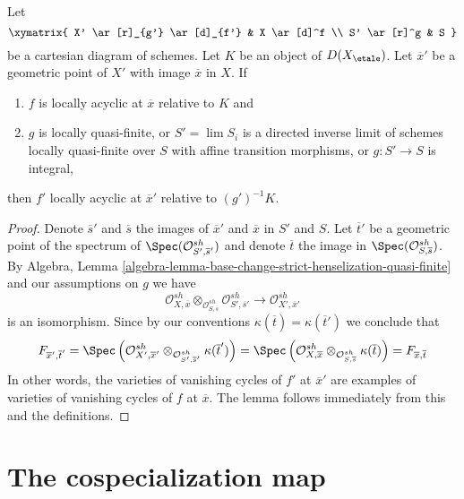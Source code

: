 \begin{lemma}
\label{lemma-locally-acyclic-quasi-finite-base-change}
Let
$$
\xymatrix{
X' \ar[r]_{g'} \ar[d]_{f'} & X \ar[d]^f \\
S' \ar[r]^g & S
}
$$
be a cartesian diagram of schemes. Let $K$ be an object of $D(X_\etale)$.
Let $\overline{x}'$ be a geometric point of $X'$ with image $\overline{x}$
in $X$. If
\begin{enumerate}
\item $f$ is locally acyclic at $\overline{x}$ relative to $K$ and
\item $g$ is locally quasi-finite, or $S' = \lim S_i$
is a directed inverse limit of schemes locally quasi-finite over $S$
with affine transition morphisms, or $g : S' \to S$ is integral,
\end{enumerate}
then $f'$ locally acyclic at $\overline{x}'$ relative to $(g')^{-1}K$.
\end{lemma}

\begin{proof}
Denote $\overline{s}'$ and $\overline{s}$ the images of
$\overline{x}'$ and $\overline{x}$ in $S'$ and $S$.
Let $\overline{t}'$ be a geometric point of the spectrum of
$\Spec(\mathcal{O}^{sh}_{S', \overline{s}'})$ and denote
$\overline{t}$ the image in $\Spec(\mathcal{O}^{sh}_{S, \overline{s}})$.
By Algebra, Lemma
\ref{algebra-lemma-base-change-strict-henselization-quasi-finite}
and our assumptions on $g$ we have
$$
\mathcal{O}^{sh}_{X, \overline{x}}
\otimes_{\mathcal{O}^{sh}_{S, \overline{s}}}
\mathcal{O}^{sh}_{S', \overline{s}'}
\longrightarrow
\mathcal{O}^{sh}_{X', \overline{x}'}
$$
is an isomorphism. Since by our conventions
$\kappa(\overline{t}) = \kappa(\overline{t}')$
we conclude that
$$
F_{\overline{x}', \overline{t}'} =
\Spec\left(
\mathcal{O}^{sh}_{X', \overline{x}'}
\otimes_{\mathcal{O}^{sh}_{S', \overline{s}'}}
\kappa(\overline{t}')\right) =
\Spec\left(
\mathcal{O}^{sh}_{X, \overline{x}}
\otimes_{\mathcal{O}^{sh}_{S, \overline{s}}}
\kappa(\overline{t})\right) =
F_{\overline{x}, \overline{t}}
$$
In other words, the varieties of vanishing cycles
of $f'$ at $\overline{x}'$ are examples of varieties of vanishing
cycles of $f$ at $\overline{x}$. The lemma follows
immediately from this and the definitions.
\end{proof}










\section{The cospecialization map}
\label{section-cospecialization}

